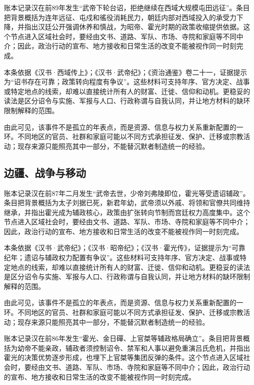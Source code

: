 账本记录汉在前89年发生“武帝下轮台诏，拒绝继续在西域大规模屯田远征”。条目把背景概括为连年远征、屯戍和徭役消耗民力，朝廷内部对西域投入的承受力下降，并指出汉廷公开强调休养和慎战，为昭帝、霍光时期的政策收缩提供依据。这个节点进入区域社会时，要经由文书、道路、军队、市场、寺院和家庭等不同中介；因此，政治行动的宣布、地方接收和日常生活的改变不能被视作同一时刻完成。

本条依据《汉书·西域传上》；《汉书·武帝纪》；《资治通鉴》卷二十一，证据提示为“诏书存在可靠；政策转向程度有争议”。这些材料可支持年序、官方决定、战事或特定地点的线索，却难以直接统计所有人的财富、迁徙、信仰和动机。更稳妥的读法是区分诏令与实施、军报与人口、行政称谓与自我认同，并让地方材料的缺环限制解释的范围。

由此可见，该事件不是孤立的年表点，而是资源、信息与权力关系重新配置的一环。不同地区的官员、社群和家庭可能以不同方式承担征发、保护、迁移或宗教活动；现存来源只能照亮其中一部分，不能替沉默者制造统一的经验。

\subsection{边疆、战争与移动}

账本记录汉在前87年二月发生“武帝去世，少帝刘弗陵即位，霍光等受遗诏辅政”。条目把背景概括为太子刘据已死，新君年幼，武帝须以外戚、将领和官僚共同维持继承，并指出霍光成为辅政核心，政策由扩张转向节制而宫廷权力高度集中。这个节点进入区域社会时，要经由文书、道路、军队、市场、寺院和家庭等不同中介；因此，政治行动的宣布、地方接收和日常生活的改变不能被视作同一时刻完成。

本条依据《汉书·武帝纪》；《汉书·昭帝纪》；《汉书·霍光传》，证据提示为“可靠纪年；遗诏与辅政权力配置有争议”。这些材料可支持年序、官方决定、战事或特定地点的线索，却难以直接统计所有人的财富、迁徙、信仰和动机。更稳妥的读法是区分诏令与实施、军报与人口、行政称谓与自我认同，并让地方材料的缺环限制解释的范围。

由此可见，该事件不是孤立的年表点，而是资源、信息与权力关系重新配置的一环。不同地区的官员、社群和家庭可能以不同方式承担征发、保护、迁移或宗教活动；现存来源只能照亮其中一部分，不能替沉默者制造统一的经验。

账本记录汉在前86年发生“霍光、金日磾、上官桀等辅政格局确立”。条目把背景概括为幼帝不能亲政，辅政者须控制诏令、禁军和人事以避免重演吕氏危机，并指出霍光的决策优势逐步形成，也埋下上官桀等集团反弹的条件。这个节点进入区域社会时，要经由文书、道路、军队、市场、寺院和家庭等不同中介；因此，政治行动的宣布、地方接收和日常生活的改变不能被视作同一时刻完成。

